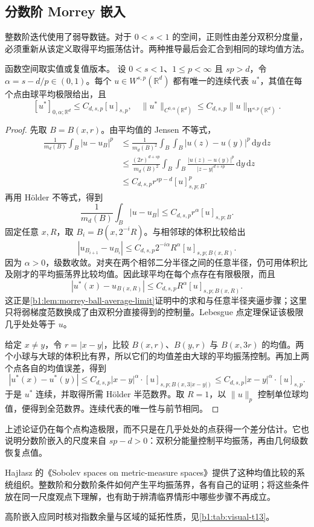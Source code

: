 \subsection{分数阶 Morrey 嵌入}
\label{b1:subsec:240403}

整数阶迭代使用了弱导数链。对于 \(0<s<1\) 的空间，正则性由差分双积分度量，必须重新从该定义取得平均振荡估计。两种推导最后会汇合到相同的球均值方法。

\begin{theorem}\label{b1:thm:fractional-morrey}
函数空间取实值或复值版本。
设 \(0<s<1\)、\(1\le p<\infty\) 且 \(sp>d\)，令
\(\alpha=s-d/p\in(0,1)\)。每个 \(u\in W^{s,p}(\mathbb R^d)\) 都有唯一的连续代表 \(u^*\)，其值在每个点由球平均极限给出，且
\[
 [u^*]_{0,\alpha;\mathbb R^d}\le C_{d,s,p}[u]_{s,p},
 \quad
 \|u^*\|_{C^{0,\alpha}(\mathbb R^d)}
 \le C_{d,s,p}\|u\|_{W^{s,p}(\mathbb R^d)}.
\]
\end{theorem}
\begin{proof}
先取 \(B=B(x,r)\)。由平均值的 Jensen 不等式，
\[
 \begin{split}
 \frac1{m_d(B)}\int_B|u-u_B|^p
 &\le\frac1{m_d(B)^2}\int_B\int_B|u(z)-u(y)|^p\,\mathrm dy\,\mathrm dz\\
 &\le\frac{(2r)^{d+sp}}{m_d(B)^2}
       \int_B\int_B
          \frac{|u(z)-u(y)|^p}{|z-y|^{d+sp}}\,\mathrm dy\,\mathrm dz\\
 &\le C_{d,s,p}r^{sp-d}[u]_{s,p;B}^p.
 \end{split}
\]
再用 Hölder 不等式，得到
\[
 \frac1{m_d(B)}\int_B|u-u_B|
 \le C_{d,s,p}r^\alpha[u]_{s,p;B}.
\]
固定任意 \(x,R\)，取 \(B_i=B(x,2^{-i}R)\)。与相邻球的体积比较给出
\[
 |u_{B_{i+1}}-u_{B_i}|
 \le C_{d,s,p}2^{-i\alpha}R^\alpha[u]_{s,p;B(x,R)}.
\]
因为 \(\alpha>0\)，级数收敛。对夹在两个相邻二分半径之间的任意半径，仍可用体积比及刚才的平均振荡界比较均值。因此球平均在每个点存在有限极限，而且
\[
 |u^*(x)-u_{B(x,R)}|
 \le C_{d,s,p}R^\alpha[u]_{s,p;B(x,R)}.
\]
这正是\cref{b1:lem:morrey-ball-average-limit}证明中的求和与任意半径夹逼步骤；这里只将弱梯度范数换成了由双积分直接得到的控制量。Lebesgue 点定理保证该极限几乎处处等于 \(u\)。

给定 \(x\ne y\)，令 \(r=|x-y|\)，比较 \(B(x,r)\)、\(B(y,r)\) 与 \(B(x,3r)\) 的均值。两个小球与大球的体积比有界，所以它们的均值差由大球的平均振荡控制。再加上两个点各自的均值误差，得到
\[
 |u^*(x)-u^*(y)|
 \le C_{d,s,p}|x-y|^\alpha\cdot[u]_{s,p;B(x,3|x-y|)}
 \le C_{d,s,p}|x-y|^\alpha\cdot[u]_{s,p}.
\]
于是 \(u^*\) 连续，并取得所需 Hölder 半范数界。取 \(R=1\)，以 \(\|u\|_p\) 控制单位球均值，便得到全范数界。连续代表的唯一性与前节相同。
\end{proof}

上述论证仍在每个点构造极限，而不只是在几乎处处的点获得一个差分估计。它也说明分数阶嵌入的尺度来自 \(sp-d>0\)：双积分能量控制平均振荡，再由几何级数恢复点值。

\ProseParagraphBreak

Hajłasz 的《Sobolev spaces on metric-measure spaces》\cite[Theorem 9.4]{Hajlasz2003SobolevMetric}提供了这种均值比较的系统组织。整数阶和分数阶条件如何产生平均振荡界，各有自己的证明；将这些条件放在同一尺度观点下理解，也有助于辨清临界情形中哪些步骤不再成立。

高阶嵌入应同时核对指数余量与区域的延拓性质，见\cref{b1:tab:visual-t13}。

